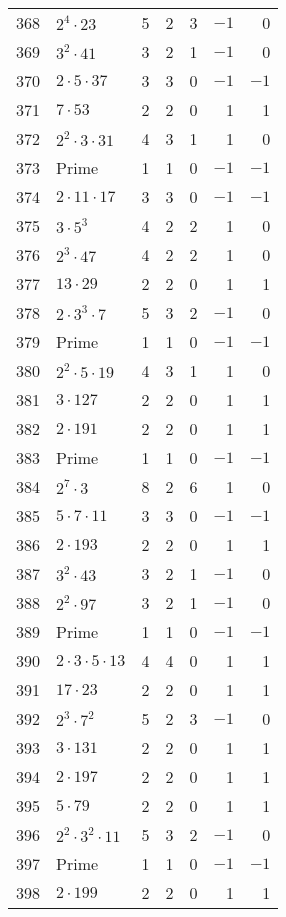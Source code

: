 \documentclass[12pt]{article}
\begin{document}
\begin{tabular}{|r|l|r|r|r|r|r|}
368 & $2^4 \cdot 23$ & 5 & 2 & 3 & $-1$ & 0 \\
369 & $3^2 \cdot 41$ & 3 & 2 & 1 & $-1$ & 0 \\
370 & $2 \cdot 5 \cdot 37$ & 3 & 3 & 0 & $-1$ & $-1$ \\
371 & $7 \cdot 53$ & 2 & 2 & 0 & 1 & 1 \\
372 & $2^2 \cdot 3 \cdot 31$ & 4 & 3 & 1 & 1 & 0 \\
373 & Prime & 1 & 1 & 0 & $-1$ & $-1$ \\
374 & $2 \cdot 11 \cdot 17$ & 3 & 3 & 0 & $-1$ & $-1$ \\
375 & $3 \cdot 5^3$ & 4 & 2 & 2 & 1 & 0 \\
376 & $2^3 \cdot 47$ & 4 & 2 & 2 & 1 & 0 \\
377 & $13 \cdot 29$ & 2 & 2 & 0 & 1 & 1 \\
378 & $2 \cdot 3^3 \cdot 7$ & 5 & 3 & 2 & $-1$ & 0 \\
379 & Prime & 1 & 1 & 0 & $-1$ & $-1$ \\
380 & $2^2 \cdot 5 \cdot 19$ & 4 & 3 & 1 & 1 & 0 \\
381 & $3 \cdot 127$ & 2 & 2 & 0 & 1 & 1 \\
382 & $2 \cdot 191$ & 2 & 2 & 0 & 1 & 1 \\
383 & Prime & 1 & 1 & 0 & $-1$ & $-1$ \\
384 & $2^7 \cdot 3$ & 8 & 2 & 6 & 1 & 0 \\
385 & $5 \cdot 7 \cdot 11$ & 3 & 3 & 0 & $-1$ & $-1$ \\
386 & $2 \cdot 193$ & 2 & 2 & 0 & 1 & 1 \\
387 & $3^2 \cdot 43$ & 3 & 2 & 1 & $-1$ & 0 \\
388 & $2^2 \cdot 97$ & 3 & 2 & 1 & $-1$ & 0 \\
389 & Prime & 1 & 1 & 0 & $-1$ & $-1$ \\
390 & $2 \cdot 3 \cdot 5 \cdot 13$ & 4 & 4 & 0 & 1 & 1 \\
391 & $17 \cdot 23$ & 2 & 2 & 0 & 1 & 1 \\
392 & $2^3 \cdot 7^2$ & 5 & 2 & 3 & $-1$ & 0 \\
393 & $3 \cdot 131$ & 2 & 2 & 0 & 1 & 1 \\
394 & $2 \cdot 197$ & 2 & 2 & 0 & 1 & 1 \\
395 & $5 \cdot 79$ & 2 & 2 & 0 & 1 & 1 \\
396 & $2^2 \cdot 3^2 \cdot 11$ & 5 & 3 & 2 & $-1$ & 0 \\
397 & Prime & 1 & 1 & 0 & $-1$ & $-1$ \\
398 & $2 \cdot 199$ & 2 & 2 & 0 & 1 & 1 \\

\end{tabular}
\end{document}
